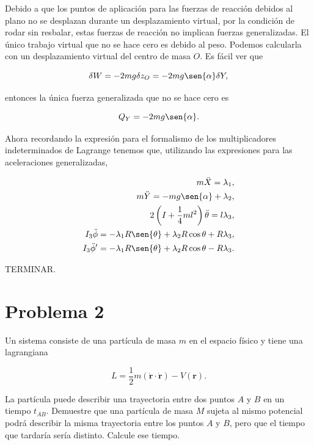 \documentclass[a4paper,10pt]{article}
\numberwithin{equation}{section}
\begin{document}
Debido a que los puntos de aplicación para las fuerzas de reacción 
debidos al plano no se desplazan durante un desplazamiento virtual, 
por la condición de rodar sin resbalar, estas fuerzas de reacción no 
implican fuerzas generalizadas. El único trabajo virtual que no 
se hace cero es debido al peso. Podemos calcularla con un desplazamiento 
virtual del centro de masa $O$. Es fácil ver que 

\begin{equation}
 \delta W = - 2mg \delta z_O = -2mg\sen{\alpha}\delta Y,
\end{equation}

entonces la única fuerza generalizada que no se hace cero es 

\begin{equation}
 Q_Y = -2mg\sen{\alpha}.
\end{equation}

Ahora recordando la expresión para el formalismo de los multiplicadores 
indeterminados de Lagrange tenemos que, utilizando las expresiones 
para las aceleraciones generalizadas,

\begin{align}
 m\ddot{X} = \lambda_1, \\
 m\ddot{Y} = - mg\sen{\alpha} + \lambda_2, \\
 2\left( I + \frac{1}{4}ml^2\right) \ddot{\theta} = l\lambda_3, \\
 I_3\ddot{\phi} = -\lambda_1 R\sen{\theta} + \lambda_2 R\cos{\theta} + R\lambda_3, \\
 I_3\ddot{\phi}' = -\lambda_1 R\sen{\theta} + \lambda_2 R\cos{\theta} - R\lambda_3.
\end{align}


TERMINAR.


\section{Problema 2}

Un sistema consiste de una partícula de masa $m$ en el espacio físico y tiene una 
lagrangiana

$$
L = \frac{1}{2}m(\mathbf{\dot{r}} \cdot \mathbf{\dot{r}}) - V(\mathbf{r}).
$$

La partícula puede describir una trayectoria entre dos puntos $A$ y $B$ en un tiempo 
$t_{AB}$. Demuestre que una partícula de masa $M$ sujeta al mismo potencial podrá 
describir la misma trayectoria entre los puntos $A$ y $B$, pero que el tiempo que 
tardaría sería distinto. Calcule ese tiempo.
\end{document}

